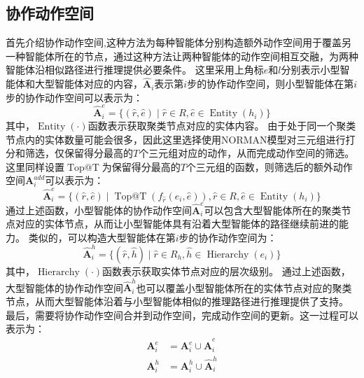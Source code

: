 \documentclass[algorithmlist, AutoFakeBold, AutoFakeSlant, figurelist, tablelist, nomlist, engineering]{seuthesix}
\begin{document}
\subsection{协作动作空间}
首先介绍协作动作空间,这种方法为每种智能体分别构造额外动作空间用于覆盖另一种智能体所在的节点，通过这种方法让两种智能体的动作空间相互交融，为两种智能体沿相似路径进行推理提供必要条件。
这里采用上角标$e$和$l$分别表示小型智能体和大型智能体对应的内容，$\bm{\hat{A}}_i$表示第$i$步的协作动作空间，则小型智能体在第$i$步的协作动作空间可以表示为：
\begin{equation}
  \bm{\hat{A}}_i^{e} = \{(\hat{r}, \hat{e}) \mid \hat{r} \in R, \hat{e} \in \operatorname{Entity}(h_i)\}
\end{equation}
其中，$\operatorname{Entity}(\cdot)$函数表示获取聚类节点对应的实体内容。
由于处于同一个聚类节点内的实体数量可能会很多，因此这里选择使用NORMAN模型对三元组进行打分和筛选，仅保留得分最高的$T$个三元组对应的动作，从而完成动作空间的筛选。
这里同样设置$\operatorname{Top@T}$为保留得分最高的$T$个三元组的函数，则筛选后的额外动作空间$\bm{A}_{i}^{add}$可以表示为：
\begin{equation}
  \bm{\hat{A}}_i^{e} = \{(\hat{r}, \hat{e}) \mid \operatorname{Top@T}(f_{\hat{r}}(e_i, \hat{e})), \hat{r} \in R, \hat{e} \in \operatorname{Entity}(h_i) \}
  \label{coo_1}
\end{equation}
通过上述函数，小型智能体的协作动作空间$\bm{\hat{A}}_i^{e}$可以包含大型智能体所在的聚类节点对应的实体节点，从而让小型智能体具有沿着大型智能体的路径继续前进的能力。
类似的，可以构造大型智能体在第$i$步的协作动作空间为：
\begin{equation}
  \bm{\hat{A}}_i^{h} = \{(\hat{r}, \hat{h}) \mid \hat{r} \in R_h, \hat{h} \in \operatorname{Hierarchy}(e_i)\}
  \label{coo_2}
\end{equation}
其中，$\operatorname{Hierarchy}(\cdot)$函数表示获取实体节点对应的层次级别。
通过上述函数，大型智能体的协作动作空间$\bm{\hat{A}}_i^{h}$也可以覆盖小型智能体所在的实体节点对应的聚类节点，从而大型智能体沿着与小型智能体相似的推理路径进行推理提供了支持。
最后，需要将协作动作空间合并到动作空间，完成动作空间的更新。这一过程可以表示为：
\begin{equation}
  \begin{aligned}
    \bm{A}_i^{e} &= \bm{A}_i^{e} \cup \bm{\hat{A}}_i^{e} \\
    \bm{A}_i^{h} &= \bm{A}_i^{h} \cup \bm{\hat{A}}_i^{h}
  \end{aligned}
\end{equation}
\end{document}
